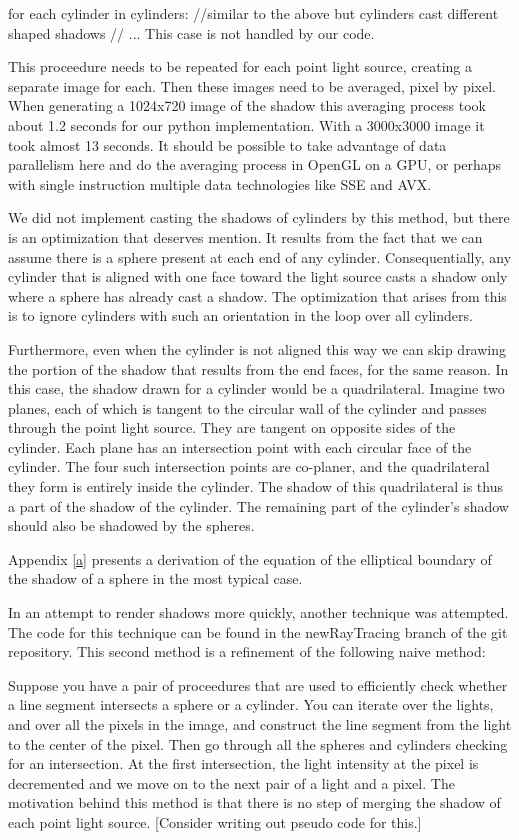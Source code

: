 \documentclass[10pt]{article}
\begin{document}
for each cylinder in cylinders:
	//similar to the above but cylinders cast different shaped shadows
	// ...
	This case is not handled by our code.

This proceedure needs to be repeated for each point light source, creating a separate image for each. Then these images need to be averaged, pixel by pixel. When generating a 1024x720 image of the shadow this averaging process took about 1.2 seconds for our python implementation. With a 3000x3000 image it took almost 13 seconds. It should be possible to take advantage of data parallelism here and do the averaging process in OpenGL on a GPU, or perhaps with single instruction multiple data technologies like SSE and AVX.

We did not implement casting the shadows of cylinders by this method, but there is an optimization that deserves mention. It results from the fact that we can assume there is a sphere present at each end of any cylinder. Consequentially, any cylinder that is aligned with one face toward the light source casts a shadow only where a sphere has already cast a shadow. The optimization that arises from this is to ignore cylinders with such an orientation in the loop over all cylinders.

Furthermore, even when the cylinder is not aligned this way we can skip drawing the portion of the shadow that results from the end faces, for the same reason. In this case, the shadow drawn for a cylinder would be a quadrilateral. Imagine two planes, each of which is tangent to the circular wall of the cylinder and passes through the point light source. They are tangent on opposite sides of the cylinder. Each plane has an intersection point with each circular face of the cylinder. The four such intersection points are co-planer, and the quadrilateral they form is entirely inside the cylinder. The shadow of this quadrilateral is thus a part of the shadow of the cylinder. The remaining part of the cylinder's shadow should also be shadowed by the spheres.

Appendix \ref{a} presents a derivation of the equation of the elliptical boundary of the shadow of a sphere in the most typical case.

In an attempt to render shadows more quickly, another technique was attempted. The code for this technique can be found in the newRayTracing branch of the git repository. This second method is a refinement of the following naive method:

Suppose you have a pair of proceedures that are used to efficiently check whether a line segment intersects a sphere or a cylinder. You can iterate over the lights, and over all the pixels in the image, and construct the line segment from the light to the center of the pixel. Then go through all the spheres and cylinders checking for an intersection. At the first intersection, the light intensity at the pixel is decremented and we move on to the next pair of a light and a pixel. The motivation behind this method is that there is no step of merging the shadow of each point light source. [Consider writing out pseudo code for this.]
\end{document}
